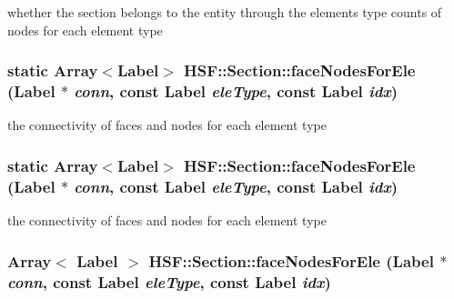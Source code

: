 whether the section belongs to the entity through the elements type counts of nodes for each element type \hypertarget{classHSF_1_1Section_a6e45839e208a8e70af86e9d51a06d1cf}{
\subsubsection[{faceNodesForEle}]{\setlength{\rightskip}{0pt plus 5cm}static Array$<${\bf Label}$>$ HSF::Section::faceNodesForEle ({\bf Label} $\ast$ {\em conn}, \/  const {\bf Label} {\em eleType}, \/  const {\bf Label} {\em idx})}}
\label{classHSF_1_1Section_a6e45839e208a8e70af86e9d51a06d1cf}


the connectivity of faces and nodes for each element type \hypertarget{classHSF_1_1Section_a6e45839e208a8e70af86e9d51a06d1cf}{
\subsubsection[{faceNodesForEle}]{\setlength{\rightskip}{0pt plus 5cm}static Array$<${\bf Label}$>$ HSF::Section::faceNodesForEle ({\bf Label} $\ast$ {\em conn}, \/  const {\bf Label} {\em eleType}, \/  const {\bf Label} {\em idx})}}
\label{classHSF_1_1Section_a6e45839e208a8e70af86e9d51a06d1cf}


the connectivity of faces and nodes for each element type \hypertarget{classHSF_1_1Section_a1590d983dafb5374bbbbb3727804b080}{
\subsubsection[{faceNodesForEle}]{\setlength{\rightskip}{0pt plus 5cm}Array$<$ {\bf Label} $>$ HSF::Section::faceNodesForEle ({\bf Label} $\ast$ {\em conn}, \/  const {\bf Label} {\em eleType}, \/  const {\bf Label} {\em idx})}}
\label{classHSF_1_1Section_a1590d983dafb5374bbbbb3727804b080}


